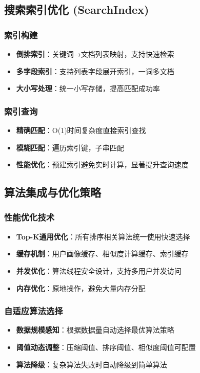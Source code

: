 \documentclass[12pt,a4paper]{article}
\begin{document}
\subsection{搜索索引优化 (SearchIndex)}
\subsubsection{索引构建}
\begin{itemize}
    \item \textbf{倒排索引}：关键词→文档列表映射，支持快速检索
    \item \textbf{多字段索引}：支持列表字段展开索引，一词多文档
    \item \textbf{大小写处理}：统一小写存储，提高匹配成功率
\end{itemize}

\subsubsection{索引查询}
\begin{itemize}
    \item \textbf{精确匹配}：O(1)时间复杂度直接索引查找
    \item \textbf{模糊匹配}：遍历索引键，子串匹配
    \item \textbf{性能优化}：预建索引避免实时计算，显著提升查询速度
\end{itemize}

\subsection{算法集成与优化策略}
\subsubsection{性能优化技术}
\begin{itemize}
    \item \textbf{Top-K通用优化}：所有排序相关算法统一使用快速选择
    \item \textbf{缓存机制}：用户画像缓存、相似度计算缓存、索引缓存
    \item \textbf{并发优化}：算法线程安全设计，支持多用户并发访问
    \item \textbf{内存优化}：原地操作，避免大量内存分配
\end{itemize}

\subsubsection{自适应算法选择}
\begin{itemize}
    \item \textbf{数据规模感知}：根据数据量自动选择最优算法策略
    \item \textbf{阈值动态调整}：压缩阈值、排序阈值、相似度阈值可配置
    \item \textbf{算法降级}：复杂算法失败时自动降级到简单算法
\end{itemize}
\end{document}
